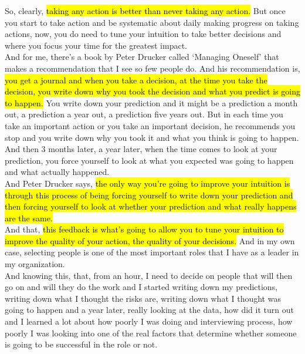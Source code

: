 \documentclass[a4paper,12pt]{article}
\begin{document}
So, clearly, \hl{taking any action is better than never taking any action.} But once you start to take action and be systematic about daily making progress on taking actions, now, you do need to tune your intuition to take better decisions and where you focus your time for the greatest impact. \\

And for me, there's a book by Peter Drucker called `Managing Oneself' that makes a recommendation that I see so few people do. And his recommendation is, \hl{you get a journal and when you take a decision, at the time you take the decision, you write down why you took the decision and what you predict is going to happen.} You write down your prediction and it might be a prediction a month out, a prediction a year out, a prediction five years out. But in each time you take an important action or you take an important decision, he recommends you stop and you write down why you took it and what you think is going to happen. And then 3 months later, a year later, when the time comes to look at your prediction, you force yourself to look at what you expected was going to happen and what actually happened. \\

And Peter Drucker says, \hl{the only way you're going to improve your intuition is through this process of being forcing yourself to write down your prediction and then forcing yourself to look at whether your prediction and what really happens are the same.} \\

And that, \hl{this feedback is what's going to allow you to tune your intuition to improve the quality of your action, the quality of your decisions.} And in my own case, selecting people is one of the most important roles that I have as a leader in my organization. \\

And knowing this, that, from an hour, I need to decide on people that will then go on and will they do the work and I started writing down my predictions, writing down what I thought the risks are, writing down what I thought was going to happen and a year later, really looking at the data, how did it turn out and I learned a lot about how poorly I was doing and interviewing process, how poorly I was looking into one of the real factors that determine whether someone is going to be successful in the role or not. \\
\end{document}
